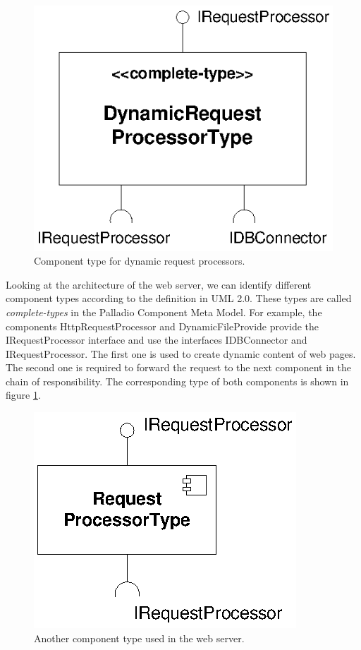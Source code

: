 \begin{figure}[htbp]
\centering
\includegraphics[scale=0.85]{example/DynamicRequestProcessorType}
\caption{Component type for dynamic request processors.}
\label{fig:DynamicRequestProcessorType}
\end{figure}

Looking at the architecture of the web server, we can identify different
component types according to the definition in UML 2.0. These types are called
\emph{complete-types} in the Palladio Component Meta Model. For example, the
components HttpRequestProcessor and DynamicFileProvide provide the
IRequestProcessor interface and use the interfaces IDBConnector and
IRequestProcessor. The first one is used to create dynamic content of web pages.
The second one is required to forward the request to the next component in the
chain of responsibility. The corresponding type of both components is shown in
figure \ref{fig:DynamicRequestProcessorType}.

\begin{figure}[htbp]
\centering
\includegraphics[scale=0.85]{example/RequestProcessorType}
\caption{Another component type used in the web server.}
\label{fig:RequestProcessorType}
\end{figure}


